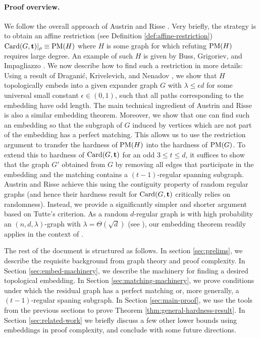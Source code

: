 \documentclass[11pt]{article}
\begin{document}
\paragraph{Proof overview.}
We follow the overall approach of Austrin and Risse \cite{Austrin_2022}. Very briefly, the strategy is to obtain an affine restriction (see Definition \ref{def:affine-restriction}) $\text{Card}(G, \mathbf{t})|_\rho \equiv \text{PM}(H)$ where $H$ is some graph for which refuting $\text{PM}(H)$ requires large degree.
An example of such $H$ is given by Buss, Grigoriev, and Impagliazzo \cite{buss1999linear}. We now describe how to find such a restriction in more details: Using a result of Dragani\'c, Krivelevich, and Nenadov \cite{draganic22rolling}, we show that $H$ topologically embeds into a given expander graph $G$ with $\lambda \le \epsilon d$ for some universal small constant $\epsilon \in (0,1)$, such that all paths corresponding to the embedding have odd length.
The main technical ingredient of Austrin and Risse is also a similar embedding theorem.
Moreover, we show that one can find such an embedding so that the subgraph of $G$ induced by vertices which are not part of the embedding has a perfect matching.
This allows us to use the restriction argument to transfer the hardness of $\text{PM}(H)$ into the hardness of $\text{PM}(G)$.
To extend this to hardness of $\text{Card}(G, \mathbf{t})$ for an odd $3 \le t \leq d$, it suffices to show that the graph $G'$ obtained from $G$ by removing all edges that participate in the embedding and the matching contains a $(t-1)$-regular spanning subgraph.
Austrin and Risse achieve this using the contiguity property of random regular graphs (and hence their hardness result for $\text{Card}(G, \mathbf{t})$ critically relies on randomness). 
Instead, we provide a significantly simpler and shorter argument based on Tutte's criterion.
 As a random $d$-regular graph is with high probability an $(n, d, \lambda)$-graph with $\lambda = \Theta(\sqrt{d})$ (see \cite[Theorem A]{tikhomirov2016spectralgapdenserandom}), our embedding theorem readily applies in the context of \citep{Austrin_2022}.\par
The rest of the document is structured as follows. 
In section \ref{sec:prelims}, we describe the requisite background from graph theory and proof complexity.
In Section \ref{sec:embed-machinery}, we describe the machinery for finding a desired topological embedding.
In Section \ref{sec:matching-machinery}, we prove conditions under which the residual graph has a perfect matching or, more generally, a $(t-1)$-regular spaning subgraph.
In Section \ref{sec:main-proof}, we use the tools from the previous sections to prove Theorem \ref{thm:general-hardness-result}. 
In Section \ref{sec:related-work} we briefly discuss a few other lower bounds using embeddings in proof complexity, and conclude with some future directions.
\end{document}
